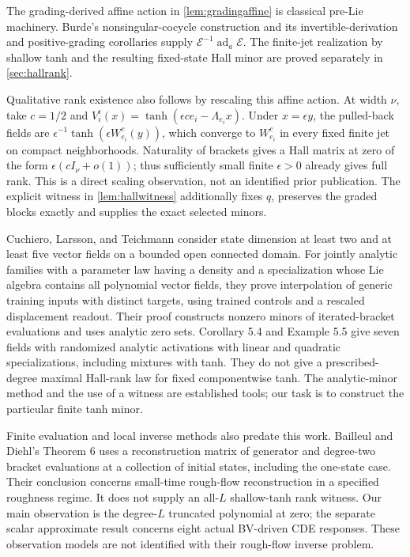 \documentclass[11pt,a4paper]{article}
\numberwithin{equation}{section}
\theoremstyle{definition}
\theoremstyle{remark}
\begin{document}
The grading-derived affine action in \cref{lem:gradingaffine} is
classical pre-Lie machinery. Burde's nonsingular-cocycle construction
and its invertible-derivation and positive-grading corollaries
\cite[Section 3.1, Proposition 3.3, Corollaries 3.4--3.5]{BurdePreLie}
supply $\mathcal E^{-1}\operatorname{ad}_a\mathcal E$.
The finite-jet realization by shallow tanh and the resulting fixed-state
Hall minor are proved separately in \cref{sec:hallrank}.

Qualitative rank existence also follows by rescaling this affine action.
At width $\nu$, take $c=1/2$ and
$V_i^\epsilon(x)=\tanh(\epsilon ce_i-\Lambda_{e_i}x)$.
Under $x=\epsilon y$, the pulled-back fields are
$\epsilon^{-1}\tanh(\epsilon W_{e_i}^c(y))$, which converge to
$W_{e_i}^c$ in every fixed finite jet on compact neighborhoods.
Naturality of brackets gives a Hall matrix at zero of the form
$\epsilon(cI_\nu+o(1))$; thus sufficiently small
finite $\epsilon>0$ already gives full rank. This is a direct scaling
observation, not an identified prior publication. The explicit witness
in \cref{lem:hallwitness} additionally fixes $q$, preserves the graded
blocks exactly and supplies the exact selected minors.

Cuchiero, Larsson, and Teichmann
\cite[Theorem 5.1 and Lemma 6.1]{CuchieroLarssonTeichmann} consider
state dimension at least two and at least five vector fields on a bounded
open connected domain. For jointly analytic families with a parameter law
having a density and a specialization whose Lie algebra contains all
polynomial vector fields, they prove interpolation of generic training
inputs with distinct targets, using trained controls and a rescaled
displacement readout. Their proof constructs nonzero
minors of iterated-bracket evaluations and uses analytic zero sets.
Corollary 5.4 and Example 5.5 give seven fields with randomized analytic activations
with linear and quadratic specializations, including mixtures with tanh.
They do not give a prescribed-degree maximal Hall-rank law for fixed
componentwise tanh. The analytic-minor method and the use of a witness
are established tools; our task is to construct the particular finite
tanh minor.

Finite evaluation and local inverse methods also predate this work.
Bailleul and Diehl's Theorem 6 \cite[p.~7]{BailleulDiehl} uses a
reconstruction matrix of generator and degree-two bracket evaluations
at a collection of initial states, including the one-state case.
Their conclusion concerns small-time rough-flow reconstruction in a
specified roughness regime. It does not supply an all-$L$ shallow-tanh
rank witness. Our main observation is the degree-$L$ truncated
polynomial at zero; the separate scalar approximate result concerns
eight actual BV-driven CDE responses. These observation models are
not identified with their rough-flow inverse problem.
\end{document}
